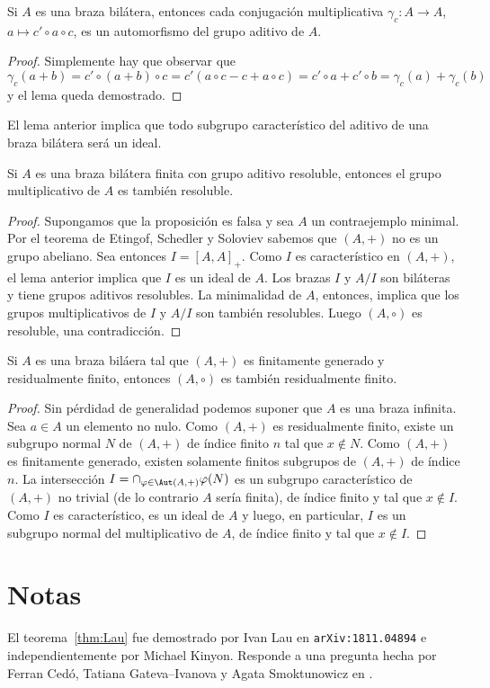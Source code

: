 \begin{lemma}
Si $A$ es una braza bilátera, entonces cada conjugación 
multiplicativa 
$\gamma_c\colon A\to A$, $a\mapsto c'\circ a\circ c$, es un automorfismo del grupo aditivo de $A$.
\end{lemma}

\begin{proof}
Simplemente hay que observar que
\[
\gamma_c(a+b)=c'\circ(a+b)\circ c=c'(a\circ c-c+a\circ c)=c'\circ a+c'\circ b=\gamma_c(a)+\gamma_c(b)
\]
y el lema queda demostrado. 
\end{proof}

El lema anterior implica que todo subgrupo característico del aditivo de una braza bilátera será
un ideal.

\begin{proposition}
Si $A$ es una braza bilátera finita con grupo aditivo resoluble, entonces
el grupo multiplicativo de $A$ es también resoluble.
\end{proposition}

\begin{proof}
Supongamos que la proposición es falsa y sea $A$ un contraejemplo minimal. Por el teorema de Etingof, Schedler
y Soloviev sabemos que $(A,+)$ no es un grupo abeliano. 
Sea entonces $I=[A,A]_+$. Como $I$ es característico en $(A,+)$, el lema anterior implica que $I$ es un ideal de $A$. Los brazas $I$ y $A/I$ son biláteras y 
tiene grupos aditivos resolubles. La minimalidad de $A$, entonces, implica que 
los grupos multiplicativos de $I$ y $A/I$ son también resolubles. Luego $(A,\circ)$ es resoluble, una contradicción.
\end{proof}

\begin{proposition}
Si $A$ es una braza biláera tal que $(A,+)$ es finitamente generado y residualmente finito, entonces
$(A,\circ)$ es también residualmente finito. 
\end{proposition}

\begin{proof}
Sin pérdidad de generalidad podemos suponer que $A$ es una braza infinita. 
Sea $a\in A$ un elemento no nulo. Como $(A,+)$ es residualmente finito, existe un subgrupo normal $N$ 
de $(A,+)$ de índice finito $n$ tal que $x\not\in N$. Como $(A,+)$ es finitamente generado, existen
solamente finitos subgrupos de $(A,+)$ de índice $n$. La intersección 
$I=\cap_{\varphi\in\Aut(A,+)}\varphi(N)$ 
es un subgrupo característico de $(A,+)$ no trivial (de lo contrario $A$ sería finita), de índice finito y tal que  $x\not\in I$. Como $I$ es característico, es un ideal de $A$ y luego, en particular, $I$ es un subgrupo 
normal del multiplicativo de $A$, de índice finito y tal que $x\not\in I$.
\end{proof}

\section*{Notas}

El teorema~\ref{thm:Lau} fue demostrado por Ivan Lau en \verb+arXiv:1811.04894+ e independientemente por Michael Kinyon. Responde a una pregunta
hecha por Ferran Cedó, Tatiana Gateva--Ivanova y Agata Smoktunowicz en 
\cite[Question 2.1(2)]{MR3818285}.
